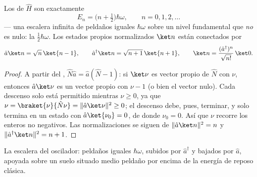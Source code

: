 \begin{theorem}\label{thm:b3:harmonic-oscillator:spectrum}
Los  de $\hat H$ son exactamente
\[
E_n = \Big(n + \tfrac12\Big)\hbar\omega , \qquad n = 0, 1, 2, \dots
\]
--- una escalera infinita de peldaños iguales $\hbar\omega$ sobre un nivel
fundamental que \emph{no} es nulo: la \emph{}
$\tfrac12\hbar\omega$. Los estados propios normalizados $\ket n$ están
conectados por
\[
\hat a\ket n = \sqrt n\,\ket{n - 1} , \qquad
\hat a^\dagger\ket n = \sqrt{n + 1}\,\ket{n + 1} ,
\qquad
\ket n = \frac{(\hat a^\dagger)^n}{\sqrt{n!}}\,\ket0 .
\]
\end{theorem}

\begin{proof}
A partir del , $\hat N\hat a = \hat a(\hat N - 1)$: si
$\ket\nu$ es vector propio de $\hat N$ con  $\nu$, entonces $\hat a\ket\nu$ es
un vector propio con $\nu - 1$ (o bien el vector nulo). Cada descenso solo
está permitido mientras $\nu \ge 0$, ya que $\nu = \braket{\nu}{\hat
N\nu} = \|\hat a\ket\nu\|^2 \ge 0$; el descenso debe, pues, terminar, y solo
termina en un estado con $\hat a\ket{\nu_0}
= 0$, de donde $\nu_0 = 0$. Así que $\nu$ recorre los enteros no
negativos. Las normalizaciones se siguen de $\|\hat a\ket n\|^2 = n$
y $\|\hat a^\dagger\ket n\|^2 = n + 1$.
\end{proof}

\begin{omfigure}

{\small La escalera del oscilador: peldaños iguales $\hbar\omega$, subidos
por $\hat a^\dagger$ y bajados por $\hat a$, apoyada sobre un suelo situado
medio peldaño por encima de la energía de reposo clásica.}
\end{omfigure}

